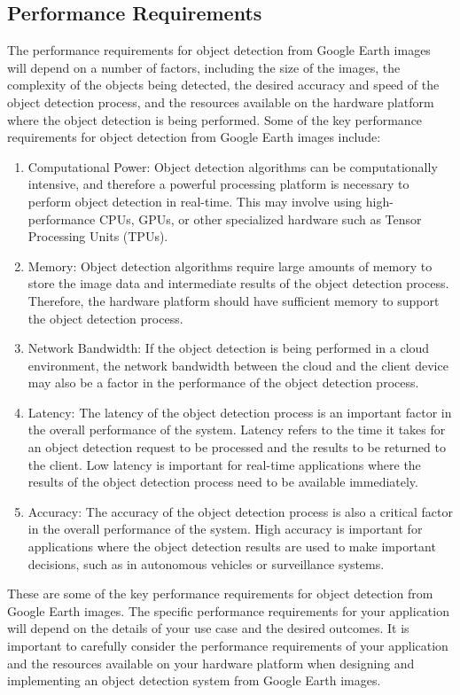 	\subsection{Performance Requirements}
	The performance requirements for object detection from Google Earth images will depend on a number of factors, including the size of the images, the complexity of the objects being detected, the desired accuracy and speed of the object detection process, and the resources available on the hardware platform where the object detection is being performed. Some of the key performance requirements for object detection from Google Earth images include:
	\begin{enumerate}
		\item Computational Power: Object detection algorithms can be computationally intensive, and therefore a powerful processing platform is necessary to perform object detection in real-time. This may involve using high-performance CPUs, GPUs, or other specialized hardware such as Tensor Processing Units (TPUs).
		\item Memory: Object detection algorithms require large amounts of memory to store the image data and intermediate results of the object detection process. Therefore, the hardware platform should have sufficient memory to support the object detection process.
		\item Network Bandwidth: If the object detection is being performed in a cloud environment, the network bandwidth between the cloud and the client device may also be a factor in the performance of the object detection process.
		\item Latency: The latency of the object detection process is an important factor in the overall performance of the system. Latency refers to the time it takes for an object detection request to be processed and the results to be returned to the client. Low latency is important for real-time applications where the results of the object detection process need to be available immediately.
		\item Accuracy: The accuracy of the object detection process is also a critical factor in the overall performance of the system. High accuracy is important for applications where the object detection results are used to make important decisions, such as in autonomous vehicles or surveillance systems. 
	\end{enumerate}
These are some of the key performance requirements for object detection from Google Earth images. The specific performance requirements for your application will depend on the details of your use case and the desired outcomes. It is important to carefully consider the performance requirements of your application and the resources available on your hardware platform when designing and implementing an object detection system from Google Earth images.
	

